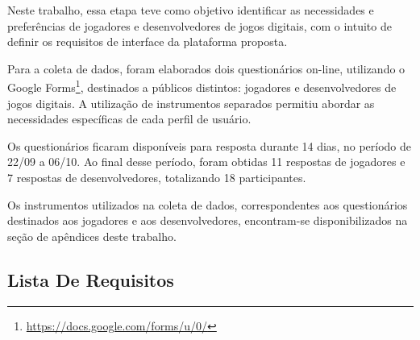 Neste trabalho, essa etapa teve como objetivo identificar as necessidades e preferências de jogadores e desenvolvedores de jogos digitais, com o intuito de definir os requisitos de interface da plataforma proposta.

Para a coleta de dados, foram elaborados dois questionários on-line, utilizando o Google Forms\footnote{\url{https://docs.google.com/forms/u/0/}}, destinados a públicos distintos: jogadores e desenvolvedores de jogos digitais. A utilização de instrumentos separados permitiu abordar as necessidades específicas de cada perfil de usuário.

Os questionários ficaram disponíveis para resposta durante 14 dias, no período de 22/09 a 06/10. Ao final desse período, foram obtidas 11 respostas de jogadores e 7 respostas de desenvolvedores, totalizando 18 participantes.

Os instrumentos utilizados na coleta de dados, correspondentes aos questionários destinados aos jogadores e aos desenvolvedores, encontram-se disponibilizados na seção de apêndices deste trabalho.


\subsection{Lista De Requisitos}


